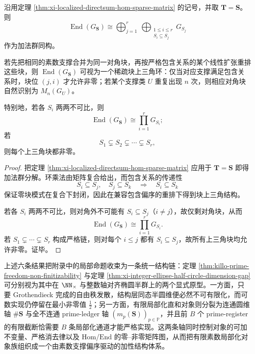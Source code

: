 \begin{corollary}[局部化直和对象族的端同态环由素数支撑偏序支配]\label{cor:xi-localized-directsum-end-ring-poset}
沿用定理 \ref{thm:xi-localized-directsum-hom-sparse-matrix} 的记号，并取 \(\mathbf T=\mathbf S\)。则
\[
\operatorname{End}(G_{\mathbf S})
\cong
\bigoplus_{j=1}^{r}\ \bigoplus_{\substack{1\le i\le r\\ S_i\subseteq S_j}} G_{S_j}
\]
作为加法群同构。

若先把相同的素数支撑合并为同一对角块，再按严格包含关系的某个线性扩张重排这些块，则 \(\operatorname{End}(G_{\mathbf S})\) 可视为一个稀疏块上三角环：仅当对应支撑满足包含关系时，块位 \((j,i)\) 才允许非零；若某个支撑类 \(U\) 重复出现 \(n\) 次，则相应对角块自然识别为 \(M_n(G_U)\)。

特别地，若各 \(S_i\) 两两不可比，则
\[
\operatorname{End}(G_{\mathbf S})\cong \prod_{i=1}^{r}G_{S_i};
\]
若
\[
S_1\subsetneq S_2\subsetneq \cdots \subsetneq S_r,
\]
则每个上三角块都非零。
\end{corollary}
\begin{proof}
把定理 \ref{thm:xi-localized-directsum-hom-sparse-matrix} 应用于 \(\mathbf T=\mathbf S\) 即得加法群分解。环乘法由矩阵复合给出，而包含关系的传递性
\[
S_i\subseteq S_j,\quad S_j\subseteq S_k
\quad\Longrightarrow\quad
S_i\subseteq S_k
\]
保证零块模式在复合下封闭，因此在兼容包含偏序的重排下得到块上三角结构。

若各 \(S_i\) 两两不可比，则对角外不可能有 \(S_i\subseteq S_j\)（\(i\neq j\)），故仅剩对角块，从而
\[
\operatorname{End}(G_{\mathbf S})\cong \prod_{i=1}^{r}G_{S_i}.
\]
若 \(S_1\subsetneq \cdots \subsetneq S_r\) 构成严格链，则对每个 \(i\le j\) 都有 \(S_i\subseteq S_j\)，故所有上三角块均允许非零。证毕。
\end{proof}

\noindent
上述六条结果把附录中的局部命题收束为一条统一结构链：定理 \ref{thm:killo-prime-freedom-non-finitizability} 与定理 \ref{thm:xi-integer-ellipse-half-circle-dimension-gap} 可分别视为其中在 \(\NN_{\times}\) 与整数轴对齐椭圆半群上的两个显式原型。一方面，只要 Grothendieck 完成的自由秩发散，结构层同态半圆维便必然不可有限化，而可数实现仍停留在最小非零值 \(\frac12\)；另一方面，有限局部化直和对象则分裂为连通圆维轴 \(\#\mathbf S\) 与全不连通 prime-ledger 轴 \((m_p(\mathbf S))_{p\in\mathbb P}\)，并且前 \(B\) 个 prime-register 的有限截断恰需要 \(B\) 条局部化通道才能严格实现。这两条轴同时控制对象的可加不变量、严格消去律以及 \(\mathrm{Hom}\)/\(\mathrm{End}\) 的零--非零矩阵图，从而把有限素数局部化对象族组织成一个由素数支撑偏序驱动的加性结构体系。

\endinput
